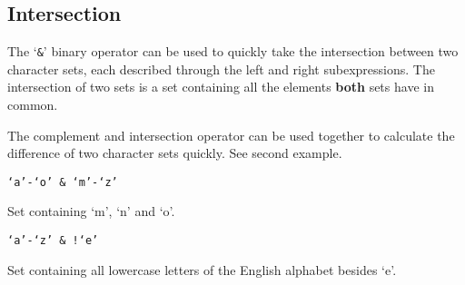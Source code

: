 
\subsection{Intersection}
{
	The `\texttt{\&}' binary operator can be used to quickly take the
	intersection between two character sets, each described through
	the left and right subexpressions. The intersection of two sets is
	a set containing all the elements \textbf{both} sets have in common.
	
	The complement and intersection operator can be used together to calculate
	the difference of two character sets quickly. See second example.
	
	\begin{itemize}
	{
		\item \texttt{`a'-`o' \& `m'-`z'}
		
			Set containing `m', `n' and `o'.
		
		\item \texttt{`a'-`z' \& !{}`e'}
		
			Set containing all lowercase letters
			of the English alphabet besides `e'.
	}
	\end{itemize}
}
